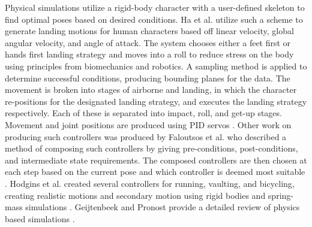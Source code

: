 \documentclass[landscape,26pt]{sciposter}
\begin{document}
\begin{minipage}[t]{17in}
		Physical simulations utilize a rigid-body character with a user-defined skeleton to find optimal poses based on desired conditions.  Ha et al. utilize such a scheme to generate landing motions for human characters based off linear velocity, global angular velocity, and angle of attack.  The system chooses either a feet first or hands first landing strategy and moves into a roll to reduce stress on the body using principles from biomechanics and robotics.  A sampling method is applied to determine successful conditions, producing bounding planes for the data.  The movement is broken into stages of airborne and landing, in which the character re-positions for the designated landing strategy, and executes the landing strategy respectively. Each of these is separated into impact, roll, and get-up stages.  Movement and joint positions are produced using PID servos \cite{falling_landing}.  Other work on producing such controllers was produced by Faloutsos et al. who described a method of composing such controllers by giving pre-conditions, post-conditions, and intermediate state requirements.  The composed controllers are then chosen at each step based on the current pose and which controller is deemed most suitable \cite{composable_controllers}.  Hodgins et al. created several controllers for running, vaulting, and bicycling, creating realistic motions and secondary motion using rigid bodies and spring-mass simulations \cite{anim_human_athletics}.  Geijtenbeek and Pronost provide a detailed review of physics based simulations \cite{inter_physics_anim}.

\end{minipage}
%
\hfill
\end{document}
